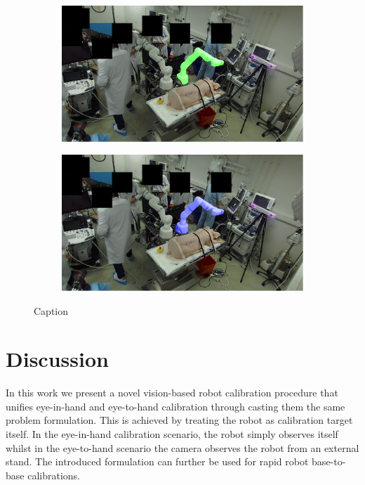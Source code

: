 \begin{figure}[tb]
    \centering
    \begin{subfigure}[b]{0.49\textwidth}
        \centering
        \includegraphics[width=\textwidth]{chapter_1/img/left_mask_overlay_0_anonymized.png}
    \end{subfigure}
    \begin{subfigure}[b]{0.49\textwidth}
        \includegraphics[width=\textwidth]{chapter_1/img/left_render_0_anonymized.png}
    \end{subfigure}
    \caption{Caption}
    \label{c1:fig:in_vivo_results}
\end{figure}

\section{Discussion}%
In this work we present a novel vision-based robot calibration procedure that unifies eye-in-hand and eye-to-hand calibration through casting them the same problem formulation. This is achieved by treating the robot as calibration target itself. In the eye-in-hand calibration scenario, the robot simply observes itself whilst in the eye-to-hand scenario the camera observes the robot from an external stand. The introduced formulation can further be used for rapid robot base-to-base calibrations.

